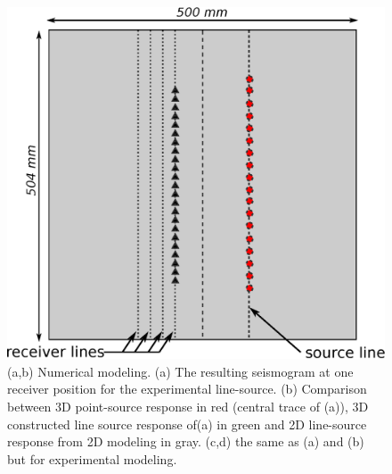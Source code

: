 \documentclass[extra,mreferee]{gji}
\begin{document}
\begin{figure}
\centering
\includegraphics[width=1.0\columnwidth]{Fig/Fig05.eps}
\caption{(a,b) Numerical modeling. (a) The resulting seismogram at one receiver position for the experimental line-source. (b) Comparison between 3D point-source response in red (central trace of (a)), 3D constructed line source response of(a) in green and 2D line-source response from 2D modeling in gray. (c,d) the same as (a) and (b) but for experimental modeling.}
\label{Fig:Fig06}
\end{figure}

\clearpage
\newpage
\end{document}
